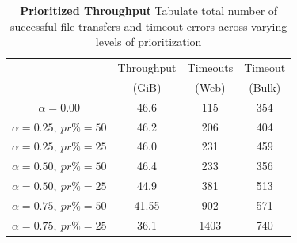 \begin{table}
  \caption[Prioritized Throughput]{\textbf{Prioritized Throughput} Tabulate total
    number of successful file transfers and timeout errors across varying levels
    of prioritization}
  \begin{center}
    \begin{tabular}{ c c c c}
      & Throughput & Timeouts & Timeout \\
      & (GiB) & (Web) & (Bulk) \\ \hline
      $\alpha = 0.00$ & 46.6 & 115 & 354 \\ \hline
      $\alpha = 0.25,\ pr\% = 50$ & 46.2 & 206 & 404 \\
      $\alpha = 0.25,\ pr\% = 25$ & 46.0 & 231 & 459 \\ \hline
      $\alpha = 0.50,\ pr\% = 50$ & 46.4 & 233 & 356 \\
      $\alpha = 0.50,\ pr\% = 25$ & 44.9 & 381 & 513 \\ \hline
      $\alpha = 0.75,\ pr\% = 50$ & 41.55 & 902 & 571 \\
      $\alpha = 0.75,\ pr\% = 25$ & 36.1 & 1403 & 740 \\

    \end{tabular}
  \end{center}
  \label{tab:modifier}
\end{table}
